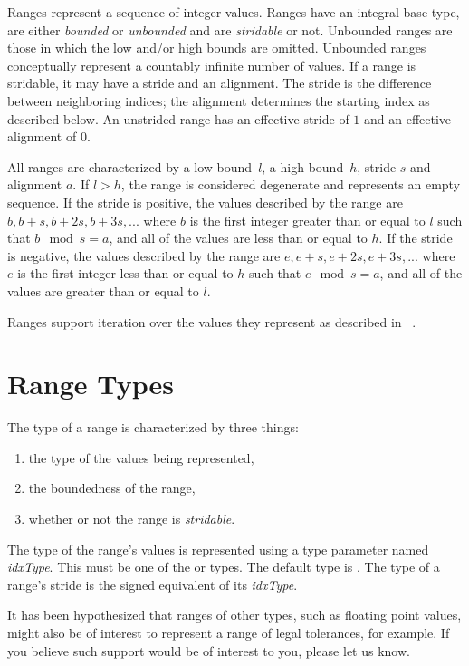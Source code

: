 \label{Ranges}

Ranges represent a sequence of integer values.  Ranges have an integral base
type, are either \emph{bounded} or \emph{unbounded} and are \emph{stridable} or not.
Unbounded ranges are those in which the low and/or high bounds are
omitted.  Unbounded ranges conceptually represent a countably infinite
number of values.  If a range is stridable, it may have a stride and an
alignment.  The stride is the difference between neighboring indices; the
alignment determines the starting index as described below.  An unstrided range
has an effective stride of $1$ and an effective alignment of $0$.

All ranges are characterized by a low bound~$l$, a high bound~$h$, stride $s$
and alignment $a$.
If $l > h$, the range is considered
degenerate and represents an empty sequence. 
If the stride is positive, the values
described by the range are $b, b+s, b+2s, b+3s, ...$ where $b$ is the first
integer greater than or equal to $l$ such that $b \mod s = a$, and all of the
values are less than or equal to $h$.  If the stride is negative, the values
described by the range are $e, e+s, e+2s, e+3s, ...$ where $e$ is the first
integer less than or equal to $h$ such that $e \mod s = a$, and all of the
values are greater than or equal to $l$.  

Ranges support iteration over the
values they represent as described in ~.


\section{Range Types}
\label{Range_Types}

The type of a range is characterized by three things:
\begin{enumerate}
\item the type of the values being represented, 
\item the boundedness of the range,
\item whether or not the range is \emph{stridable}.
\end{enumerate}

The type of the range's values is represented using a type parameter
named \emph{idxType}.  This must be one of the  or
 types.  The default type is .
The type of a range's stride is the signed equivalent of its \emph{idxType}.

\begin{openissue}
It has been hypothesized that ranges of other types, such as floating
point values, might also be of interest to represent a range of legal
tolerances, for example.  If you believe such support would be of
interest to you, please let us know.
\end{openissue}

